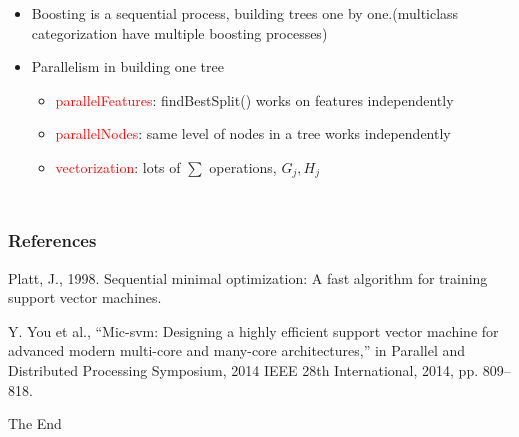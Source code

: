 \documentclass{beamer}
\begin{document}
\begin{frame}
\begin{columns}[c]
		\begin{itemize}
			\item Boosting is a sequential process, building trees one by one.(multiclass categorization have multiple boosting processes)
			\item Parallelism in building one tree
			\begin{itemize}			
				\item \textcolor{red}{parallelFeatures}: findBestSplit() works on features independently
				\item \textcolor{red}{parallelNodes}: same level of nodes in a tree works independently
				\item \textcolor{red}{vectorization}: lots of $\sum$ operations, $G_j, H_j$
			\end{itemize}			
			
		\end{itemize}
	\end{columns}	
	
\end{frame}





\begin{frame}
\frametitle{References}
\footnotesize{
\begin{thebibliography}{99} %

 Platt, J., 1998. Sequential minimal optimization: A fast algorithm for training support vector machines.

 Y. You et al., “Mic-svm: Designing a highly efficient support vector machine for advanced modern multi-core and many-core architectures,” in Parallel and Distributed Processing Symposium, 2014 IEEE 28th International, 2014, pp. 809–818.

\end{thebibliography}
}
\end{frame}




\begin{frame}
\Huge{\centerline{The End}}
\end{frame}

\end{document}
